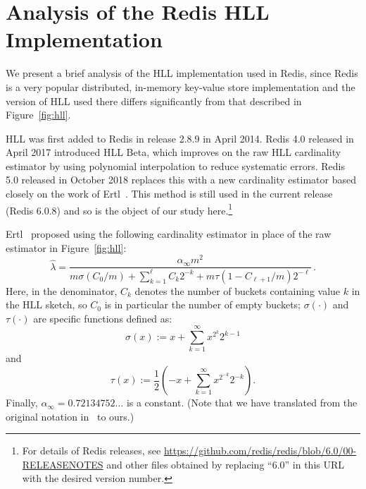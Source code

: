 \documentclass{article}
\begin{document}


\section{Analysis of the Redis HLL Implementation}\label{sec:redis}

We present a brief analysis of the HLL implementation used in Redis, since Redis is a very popular distributed, in-memory key-value store implementation and the version of HLL used there differs significantly from that described in Figure~\ref{fig:hll}.

HLL was first added to Redis in release 2.8.9 in April 2014. Redis 4.0 released in April 2017 introduced HLL Beta, which improves on the raw HLL cardinality estimator by using polynomial interpolation to reduce systematic errors. Redis 5.0 released in October 2018 replaces this with a new cardinality estimator based closely on the work of Ertl~\cite{hllnew}. This method is still used in the current release (Redis 6.0.8) and so is the object of our study here.\footnote{For details of Redis releases, see \url{https://github.com/redis/redis/blob/6.0/00-RELEASENOTES} and other files obtained by replacing ``6.0'' in this URL with the desired version number.}

Ertl~\cite{hllnew} proposed using the following cardinality estimator in place of the raw estimator in Figure~\ref{fig:hll}:
\begin{equation}\label{eqn:ertl}
\hat{\lambda}  = \frac{\alpha_\infty m^2}{m\sigma(C_0/m) + \sum_{k=1}^{\ell}C_k 2^{-k} + m \tau(1-C_{\ell+1}/m)2^{-\ell}} \, .
\end{equation}
Here, in the denominator, $C_k$ denotes the number of buckets containing value $k$ in the HLL sketch, so $C_0$ is in particular the number of empty buckets; $\sigma(\cdot)$ and $\tau(\cdot)$ are specific functions defined as:
\[
\sigma(x) :=  x + \sum_{k=1}^{\infty} x^{2^k} 2^{k-1}
\]
and
\[
\tau(x) :=  \frac{1}{2} \left( -x + \sum_{k=1}^{\infty} x^{2^{-k}} 2^{-k} \right).
\]
Finally,  $\alpha_\infty  = 0.72134752\ldots$ is a constant. (Note that we have translated from the original notation in~\cite{hllnew} to ours.)
\end{document}
